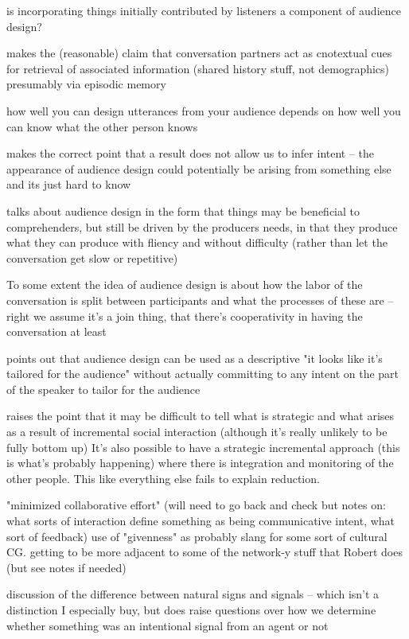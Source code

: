\documentclass[]{article}
\begin{document}
is incorporating things initially contributed by listeners a component of audience design? 

\cite{horton2005} makes the (reasonable) claim that conversation partners act as cnotextual cues for retrieval of associated information (shared history stuff, not demographics) presumably via episodic memory 

\cite{horton2005} how well you can design utterances from your audience depends on how well you can know what the other person knows

\cite{horton1996} makes the correct point that a result does not allow us to infer intent -- the appearance of audience design could potentially be arising from something else and its just hard to know

\cite{macdonald2013} talks about audience design in the form that things may be beneficial to comprehenders, but still be driven by the producers needs, in that they produce what they can produce with fliency and without difficulty (rather than let the conversation get slow or repetitive) 

To some extent the idea of audience design is about how the labor of the conversation is split between participants and what the processes of these are -- right we assume it's a join thing, that there's cooperativity in having the conversation at least 

\cite{rogers2013} points out that audience design can be used as a descriptive "it looks like it's tailored for the audience" without actually committing to any intent on the part of the speaker to tailor for the audience 

\cite{rogers2013} raises the point that it may be difficult to tell what is strategic and what arises as a result of incremental social interaction (although it's really unlikely to be fully bottom up) It's also possible to have a strategic incremental approach (this is what's probably happening) where there is integration and monitoring of the other people. This like everything else fails to explain reduction. 

\cite{fay2010} "minimized collaborative effort" (will need to go back and check but notes on: what sorts of interaction define something as being communicative intent, what sort of feedback) use of "givenness" as probably slang for some sort of cultural CG. getting to be more adjacent to some of the network-y stuff that Robert does (but see notes if needed) 


\cite{clark1996}
discussion of the difference between natural signs and signals -- which isn't a distinction I especially buy, but does raise questions over how we determine whether something was an intentional signal from an agent or not 
\end{document}
